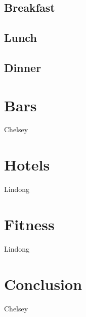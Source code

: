 \documentclass[12pt]{article}
\begin{document}
\subsection{Breakfast}

\subsection{Lunch}

\subsection{Dinner}

\section{Bars}

Chelsey

\section{Hotels}

Lindong

\section{Fitness}

Lindong


\section{Conclusion}


Chelsey
\end{document}
